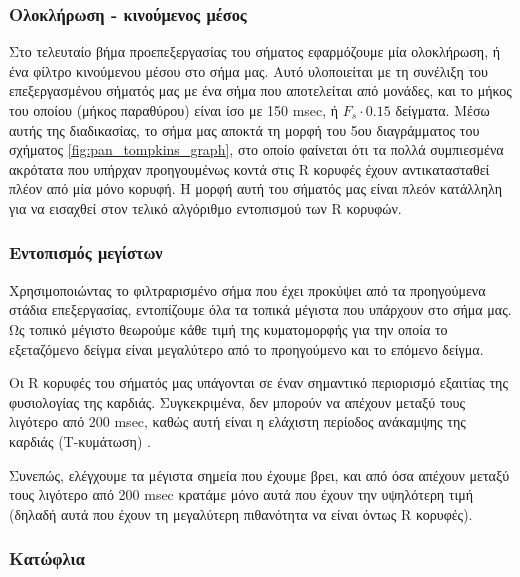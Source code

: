 \subsubsection*{Ολοκλήρωση - κινούμενος μέσος}

Στο τελευταίο βήμα προεπεξεργασίας του σήματος εφαρμόζουμε μία ολοκλήρωση, ή ένα φίλτρο κινούμενου μέσου στο σήμα μας. Αυτό υλοποιείται με τη συνέλιξη του επεξεργασμένου σήματός μας με ένα σήμα που αποτελείται από μονάδες, και το μήκος του οποίου (μήκος παραθύρου) είναι ίσο με 150 msec, ή $F_s\cdot0.15$ δείγματα. Μέσω αυτής της διαδικασίας, το σήμα μας αποκτά τη μορφή του 5ου διαγράμματος του σχήματος \ref{fig:pan_tompkins_graph}, στο οποίο φαίνεται ότι τα πολλά συμπιεσμένα ακρότατα που υπήρχαν προηγουμένως κοντά στις R κορυφές έχουν αντικατασταθεί πλέον από μία μόνο κορυφή. Η μορφή αυτή του σήματός μας είναι πλεόν κατάλληλη για να εισαχθεί στον τελικό αλγόριθμο εντοπισμού των R κορυφών.

\subsubsection*{Εντοπισμός μεγίστων}

Χρησιμοποιώντας το φιλτραρισμένο σήμα που έχει προκύψει από τα προηγούμενα στάδια επεξεργασίας, εντοπίζουμε όλα τα τοπικά μέγιστα που υπάρχουν στο σήμα μας. Ως τοπικό μέγιστο θεωρούμε κάθε τιμή της κυματομορφής για την οποία το εξεταζόμενο δείγμα είναι μεγαλύτερο από το προηγούμενο και το επόμενο δείγμα. 

Οι R κορυφές του σήματός μας υπάγονται σε έναν σημαντικό περιορισμό εξαιτίας της φυσιολογίας της καρδιάς. Συγκεκριμένα, δεν μπορούν να απέχουν μεταξύ τους λιγότερο από 200 msec, καθώς αυτή είναι η ελάχιστη περίοδος ανάκαμψης της καρδιάς (Τ-κυμάτωση) \cite{wikiT_wave}. 

Συνεπώς, ελέγχουμε τα μέγιστα σημεία που έχουμε βρει, και από όσα απέχουν μεταξύ τους λιγότερο από 200 msec κρατάμε μόνο αυτά που έχουν την υψηλότερη τιμή (δηλαδή αυτά που έχουν τη μεγαλύτερη πιθανότητα να είναι όντως R κορυφές).

\subsubsection*{Κατώφλια}


